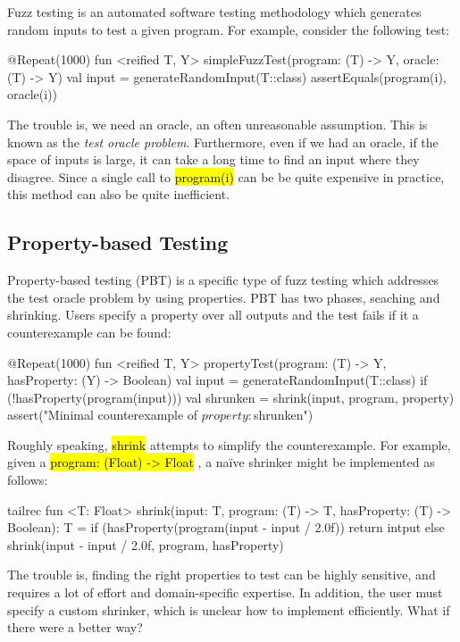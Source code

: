 \documentclass[12pt,initial,twoside,maitrise]{dms}
\newcommand{\inline}[1]{%
\begingroup%
\sethlcolor{slightgray}%
\hl{\ttfamily\small #1}%
\endgroup
}
\numberwithin{equation}{section}
\numberwithin{table}{chapter}
\numberwithin{figure}{chapter}
\begin{document}
Fuzz testing is an automated software testing methodology which generates random inputs to test a given program. For example, consider the following test:
%
\begin{kotlinlisting}
@Repeat(1000)
fun <reified T, Y> simpleFuzzTest(program: (T) -> Y, oracle: (T) -> Y) {
        val input = generateRandomInput(T::class)
        assertEquals(program(i), oracle(i))
}
\end{kotlinlisting}
%
The trouble is, we need an oracle, an often unreasonable assumption. This is known as the \textit{test oracle problem}. Furthermore, even if we had an oracle, if the space of inputs is large, it can take a long time to find an input where they disagree. Since a single call to \inline{program(i)} can be be quite expensive in practice, this method can also be quite inefficient.

\subsection{Property-based Testing}\label{subsec:property-based-testing}

Property-based testing (PBT) is a specific type of fuzz testing which addresses the test oracle problem by using properties. PBT has two phases, seaching and shrinking. Users specify a property over all outputs and the test fails if it a counterexample can be found:
%
\begin{kotlinlisting}
@Repeat(1000)
fun <reified T, Y> propertyTest(program: (T) -> Y, hasProperty: (Y) -> Boolean) {
    val input = generateRandomInput(T::class)
    if (!hasProperty(program(input))) {
        val shrunken = shrink(input, program, property)
        assert("Minimal counterexample of $property: $shrunken")
    }
}
\end{kotlinlisting}
%
Roughly speaking, \inline{shrink} attempts to simplify the counterexample. For example, given a \inline{program: (Float) -> Float}, a na\"ive shrinker might be implemented as follows:
%
\begin{kotlinlisting}
tailrec fun <T: Float> shrink(input: T, program: (T) -> T, hasProperty: (T) -> Boolean): T =
    if (hasProperty(program(input - input / 2.0f)) return intput
    else shrink(input - input / 2.0f, program, hasProperty)
\end{kotlinlisting}
%
The trouble is, finding the right properties to test can be highly sensitive, and requires a lot of effort and domain-specific expertise. In addition, the user must specify a custom shrinker, which is unclear how to implement efficiently. What if there were a better way?
\end{document}
